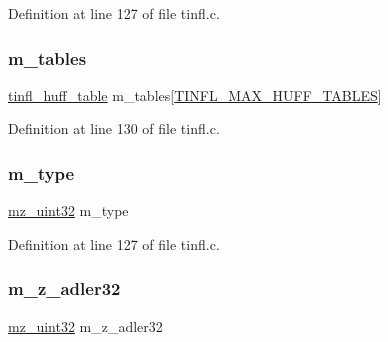 Definition at line 127 of file tinfl.\+c.

\mbox{\label{structtinfl__decompressor__tag_af3ceba45e4c8727c214c618f3987f105}} 
\subsubsection{\texorpdfstring{m\_tables}{m\_tables}}
{\footnotesize\ttfamily \mbox{\hyperlink{structtinfl__huff__table}{tinfl\+\_\+huff\+\_\+table}} m\+\_\+tables\mbox{[}\mbox{\hyperlink{tinfl_8c_adf764cbdea00d65edcd07bb9953ad2b7ad908ef7390a1643b0f0dece0d816bd64}{T\+I\+N\+F\+L\+\_\+\+M\+A\+X\+\_\+\+H\+U\+F\+F\+\_\+\+T\+A\+B\+L\+ES}}\mbox{]}}



Definition at line 130 of file tinfl.\+c.

\mbox{\label{structtinfl__decompressor__tag_ada5c7f3627958c65b19f2791c802d43d}} 
\subsubsection{\texorpdfstring{m\_type}{m\_type}}
{\footnotesize\ttfamily \mbox{\hyperlink{tinfl_8c_ab1a91818a39ac203d5d9f12a003e8557}{mz\+\_\+uint32}} m\+\_\+type}



Definition at line 127 of file tinfl.\+c.

\mbox{\label{structtinfl__decompressor__tag_a64c2f8bd81e440a3e789da4cbbc8d8fb}} 
\subsubsection{\texorpdfstring{m\_z\_adler32}{m\_z\_adler32}}
{\footnotesize\ttfamily \mbox{\hyperlink{tinfl_8c_ab1a91818a39ac203d5d9f12a003e8557}{mz\+\_\+uint32}} m\+\_\+z\+\_\+adler32}



